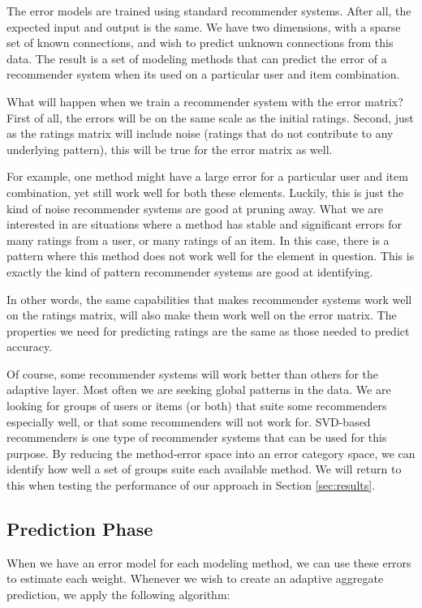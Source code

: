 The error models are trained using standard recommender systems.
After all, the expected input and output is the same.
We have two dimensions, with a sparse set of known connections,
and wish to predict unknown connections from this data.
The result is a set of modeling methods
that can predict the error of a recommender system
when its used on a particular user and item combination.

What will happen when we train a recommender system with the error matrix?
First of all, the errors will be on the same scale as the initial ratings.
Second, just as the ratings matrix will include noise (ratings that
do not contribute to any underlying pattern), this will be 
true for the error matrix as well.

For example, one method might have a large error for a particular user and item combination,
yet still work well for both these elements. 
Luckily, this is 
just the kind of noise recommender systems are good at pruning away.
What we are interested in are situations where a method
has stable and significant errors for many ratings from a user,
or many ratings of an item.
In this case, there is a pattern where this method does not 
work well for the element in question.
This is exactly the kind of pattern recommender systems are good at identifying.

In other words, the same capabilities that makes recommender systems work well
on the ratings matrix, will also make them work well on the error matrix.
The properties we need for predicting ratings
are the same as those needed to predict accuracy.

Of course, some recommender systems will work better than others for the adaptive layer.
Most often we are seeking global patterns in the data.
We are looking for groups of users or items (or both) that suite some 
recommenders especially well, or that some recommenders will not work for.
SVD-based recommenders is one type of recommender systems that can be used for this purpose.
By reducing the method-error space into an error category space,
we can identify how well a set of groups suite each available method.
We will return to this when testing the performance
of our approach in Section \ref{sec:results}.


\subsection{Prediction Phase}

When we have an error model for each modeling method, 
we can use these errors to estimate each weight.
Whenever we wish to create an adaptive aggregate prediction,
we apply the following algorithm:

